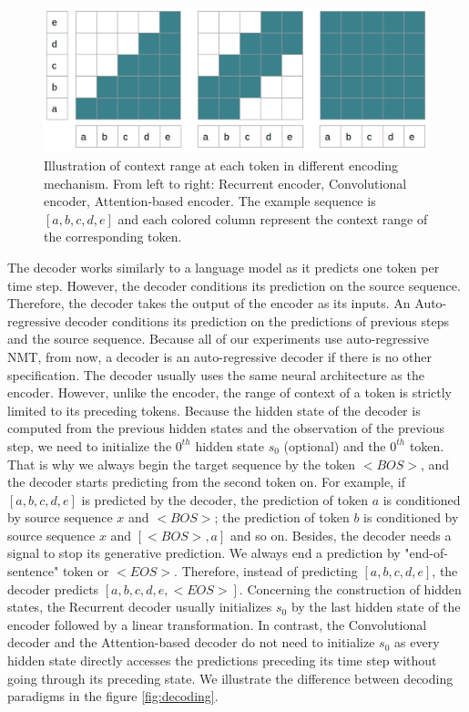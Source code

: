 \begin{figure}[htbp]
\includegraphics[width=\textwidth]{graphics/encoding.png}
\caption[Illustration of context range at each token in different encoding mechanism]{Illustration of context range at each token in different encoding mechanism. From left to right: Recurrent encoder, Convolutional encoder, Attention-based encoder. The example sequence is $[a,b,c,d,e]$ and each colored column represent the context range of the corresponding token.}
\label{fig:encoding}
\end{figure}

The decoder works similarly to a language model as it predicts one token per time step. However, the decoder conditions its prediction on the source sequence. Therefore, the decoder takes the output of the encoder as its inputs. An Auto-regressive decoder conditions its prediction on the predictions of previous steps and the source sequence. Because all of our experiments use auto-regressive NMT, from now, a decoder is an auto-regressive decoder if there is no other specification. The decoder usually uses the same neural architecture as the encoder. However, unlike the encoder, the range of context of a token is strictly limited to its preceding tokens. Because the hidden state of the decoder is computed from the previous hidden states and the observation of the previous step, we need to initialize the $0^{th}$ hidden state $s_0$ (optional) and the $0^{th}$ token. That is why we always begin the target sequence by the token $<BOS>$, and the decoder starts predicting from the second token on. For example, if $[a,b,c,d,e]$ is predicted by the decoder, the prediction of token $a$ is conditioned by source sequence $x$ and $<BOS>$; the prediction of token $b$ is conditioned by source sequence $x$ and $[<BOS>,a]$ and so on. Besides, the decoder needs a signal to stop its generative prediction. We always end a prediction by "end-of-sentence" token or $<EOS>$. Therefore, instead of predicting $[a,b,c,d,e]$, the decoder predicts $[a,b,c,d,e, <EOS>]$. Concerning the construction of hidden states, the Recurrent decoder usually initializes $s_0$ by the last hidden state of the encoder followed by a linear transformation. In contrast, the Convolutional decoder and the Attention-based decoder do not need to initialize $s_0$ as every hidden state directly accesses the predictions preceding its time step without going through its preceding state. We illustrate the difference between decoding paradigms in the figure \ref{fig:decoding}.

